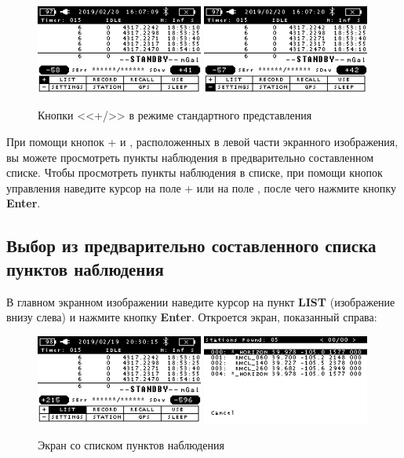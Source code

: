 \begin{figure}[h]
  \centering
  \includegraphics[width=0.49\textwidth]{figures/+_-_buttons_under_standard_station_style_1}
  \includegraphics[width=0.49\textwidth]{figures/+_-_buttons_under_standard_station_style_2}
  \caption{Кнопки <<+/\textminus{}>> в режиме стандартного представления}
  \label{fig:+_-_buttons_under_standard_station_style}
\end{figure}

При помощи кнопок + и \textminus{}, расположенных в левой части экранного
изображения, вы можете просмотреть пункты наблюдения в предварительно
составленном списке. Чтобы просмотреть пункты наблюдения в списке, при помощи
кнопок управления наведите курсор на поле + или на поле \textminus{}, после чего
нажмите кнопку \textbf{Enter}.

\subsection{Выбор из предварительно составленного списка пунктов наблюдения}

В главном экранном изображении наведите курсор на пункт \textbf{LIST}
(изображение внизу слева) и нажмите кнопку \textbf{Enter}. Откроется экран,
показанный справа:

\begin{figure}[h]
  \centering
  \includegraphics[width=0.49\textwidth]{figures/station_list_screen_1}
  \includegraphics[width=0.49\textwidth]{figures/station_list_screen_2}
  \caption{Экран со списком пунктов наблюдения}
  \label{fig:station_list_screen}
\end{figure}

